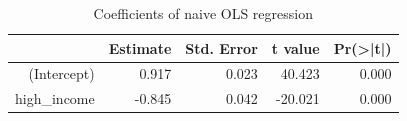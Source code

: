 \begin{table}[ht]
\centering
\begin{tabular}{rrrrr}
  \hline
 & Estimate & Std. Error & t value & Pr(>|t|) \\ 
  \hline
(Intercept) & 0.917 & 0.023 & 40.423 & 0.000 \\ 
  high\_income & -0.845 & 0.042 & -20.021 & 0.000 \\ 
   \hline
\end{tabular}
\caption{Coefficients of naive OLS regression} 
\label{tab:naive-regression-exp}
\end{table}
